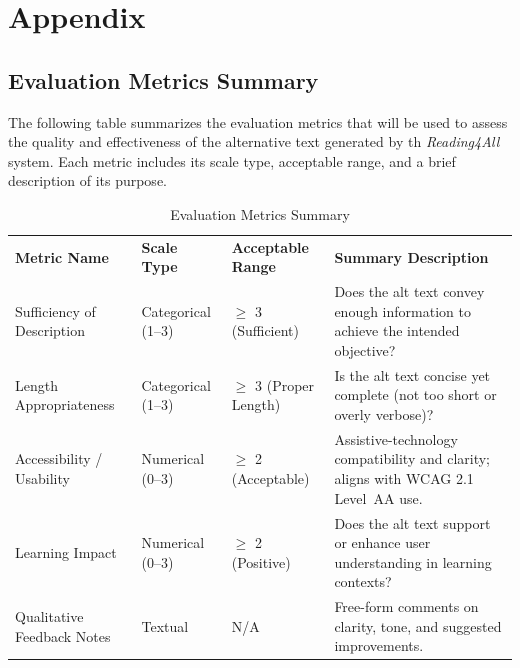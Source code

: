 \documentclass[12pt, titlepage]{article}
\begin{document}
\newpage





\newpage

\section{Appendix}


\subsection{Evaluation Metrics Summary}
\label{appendix:evaluation-metrics}
The following table summarizes the evaluation metrics that will be
used to assess the quality and effectiveness of the alternative text
generated by th \textit{Reading4All} system. Each metric includes its scale
type, acceptable range, and a brief description of its purpose.
\begin{table}[H]
  \centering
  \caption{Evaluation Metrics Summary}
  \label{tab:evaluation-metrics-summary}
  \begin{tabular}{ p{3.5cm}p{3cm}p{3cm}p{4cm} }
    
    \textbf{Metric Name} & \textbf{Scale Type} & \textbf{Acceptable
    Range} & \textbf{Summary Description} \\
    
    Sufficiency of Description
    & Categorical (1--3)
    & $\geq$ 3 (Sufficient)
    & Does the alt text convey enough information to achieve the
    intended objective? \\
    
    Length Appropriateness
    & Categorical (1--3)
    & $\geq$ 3 (Proper Length)
    & Is the alt text concise yet complete (not too short or overly verbose)? \\
    
    Accessibility / Usability
    & Numerical (0--3)
    & $\geq$ 2 (Acceptable)
    & Assistive-technology compatibility and clarity; aligns with
    WCAG 2.1 Level~AA use. \\
    
    Learning Impact
    & Numerical (0--3)
    & $\geq$ 2 (Positive)
    & Does the alt text support or enhance user understanding in
    learning contexts? \\
    
    Qualitative Feedback Notes
    & Textual
    & N/A
    & Free-form comments on clarity, tone, and suggested improvements. \\
    
  \end{tabular}
\end{table}
\end{document}
